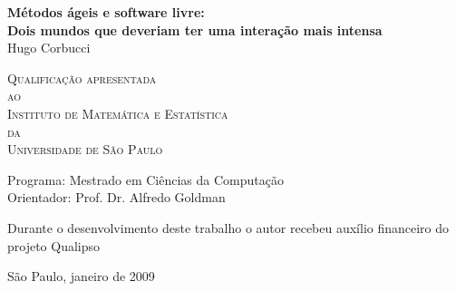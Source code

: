 \documentclass[11pt,twoside,letterpaper]{book}
\begin{document}
\frontmatter \onehalfspacing  %

\thispagestyle{empty}
\begin{center}
    \vspace*{2.3cm}
    \textbf{\Large{Métodos ágeis e software livre:\\
        Dois mundos que deveriam ter uma interação mais intensa}}\\
	
    \vspace*{1.2cm}
    \Large{Hugo Corbucci}
    
    \vskip 2cm
	\textsc{
	Qualificação apresentada\\[-0.25cm] 
	ao\\[-0.25cm]
	Instituto de Matemática e Estatística\\[-0.25cm]
	da\\[-0.25cm]
	Universidade de São Paulo}
    
    \vskip 1.5cm
    Programa: Mestrado em Ciências da Computação\\
    Orientador: Prof. Dr. Alfredo Goldman

    \vskip 1cm
	\normalsize{Durante o desenvolvimento deste trabalho o autor recebeu auxílio
	financeiro do projeto Qualipso}
	
    \vskip 0.5cm
    \normalsize{São Paulo, janeiro de 2009}
\end{center}

%
%
%
%
%	
%	  
\end{document}
